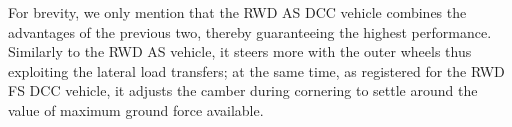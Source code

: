 

For brevity, we only mention that the RWD AS DCC vehicle combines the advantages of the previous two, thereby guaranteeing the highest performance. Similarly to the RWD AS vehicle, it steers more with the outer wheels thus exploiting the lateral load transfers; at the same time, as registered for the RWD FS DCC vehicle, it adjusts the camber during cornering to settle around the value of maximum ground force available.


